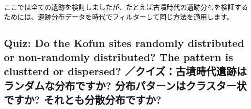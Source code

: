 \documentclass[
  xelatex,ja=standard]{bxjsarticle}
\newenvironment{Shaded}{\begin{snugshade}}{\end{snugshade}}
\newcommand{\CommentTok}[1]{\textcolor[rgb]{0.56,0.35,0.01}{\textit{#1}}}
\newcommand{\DataTypeTok}[1]{\textcolor[rgb]{0.13,0.29,0.53}{#1}}
\newcommand{\DecValTok}[1]{\textcolor[rgb]{0.00,0.00,0.81}{#1}}
\newcommand{\KeywordTok}[1]{\textcolor[rgb]{0.13,0.29,0.53}{\textbf{#1}}}
\newcommand{\NormalTok}[1]{#1}
\newcommand{\OperatorTok}[1]{\textcolor[rgb]{0.81,0.36,0.00}{\textbf{#1}}}
\newcommand{\OtherTok}[1]{\textcolor[rgb]{0.56,0.35,0.01}{#1}}
\newcommand{\StringTok}[1]{\textcolor[rgb]{0.31,0.60,0.02}{#1}}
\begin{document}
ここでは全ての遺跡を検討しましたが、たとえば古墳時代の遺跡分布を検証するためには、遺跡分布データを時代でフィルターして同じ方法を適用します。

\hypertarget{quiz-do-the-kofun-sites-randomly-distributed-or-non-randomly-distributed-the-pattern-is-clustterd-or-dispersed-ux30afux30a4ux30baux53e4ux58b3ux6642ux4ee3ux907aux8de1ux306fux30e9ux30f3ux30c0ux30e0ux306aux5206ux5e03ux3067ux3059ux304b-ux5206ux5e03ux30d1ux30bfux30fcux30f3ux306fux30afux30e9ux30b9ux30bfux30fcux72b6ux3067ux3059ux304b-ux305dux308cux3068ux3082ux5206ux6563ux5206ux5e03ux3067ux3059ux304b}{%
\subsection{Quiz: Do the Kofun sites randomly distributed or
non-randomly distributed? The pattern is clustterd or dispersed?
／クイズ：古墳時代遺跡はランダムな分布ですか?
分布パターンはクラスター状ですか?
それとも分散分布ですか?}\label{quiz-do-the-kofun-sites-randomly-distributed-or-non-randomly-distributed-the-pattern-is-clustterd-or-dispersed-ux30afux30a4ux30baux53e4ux58b3ux6642ux4ee3ux907aux8de1ux306fux30e9ux30f3ux30c0ux30e0ux306aux5206ux5e03ux3067ux3059ux304b-ux5206ux5e03ux30d1ux30bfux30fcux30f3ux306fux30afux30e9ux30b9ux30bfux30fcux72b6ux3067ux3059ux304b-ux305dux308cux3068ux3082ux5206ux6563ux5206ux5e03ux3067ux3059ux304b}}

\begin{Shaded}
\end{Shaded}
\end{document}
